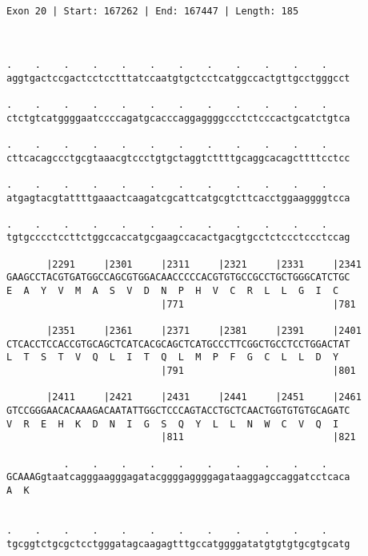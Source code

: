 \documentclass{article}
\begin{document}
\begin{Verbatim}
                                       
 
Exon 20 | Start: 167262 | End: 167447 | Length: 185



.    .    .    .    .    .    .    .    .    .    .    .    
aggtgactccgactcctcctttatccaatgtgctcctcatggccactgttgcctgggcct
                                                            
.    .    .    .    .    .    .    .    .    .    .    .    
ctctgtcatggggaatccccagatgcacccaggaggggccctctcccactgcatctgtca
                                                            
.    .    .    .    .    .    .    .    .    .    .    .    
cttcacagccctgcgtaaacgtccctgtgctaggtcttttgcaggcacagcttttcctcc
                                                            
.    .    .    .    .    .    .    .    .    .    .    .    
atgagtacgtattttgaaactcaagatcgcattcatgcgtcttcacctggaaggggtcca
                                                            
.    .    .    .    .    .    .    .    .    .    .    .    
tgtgcccctccttctggccaccatgcgaagccacactgacgtgcctctccctccctccag
                                                            
       |2291     |2301     |2311     |2321     |2331     |2341
GAAGCCTACGTGATGGCCAGCGTGGACAACCCCCACGTGTGCCGCCTGCTGGGCATCTGC
E  A  Y  V  M  A  S  V  D  N  P  H  V  C  R  L  L  G  I  C  
                           |771                          |781
  
       |2351     |2361     |2371     |2381     |2391     |2401
CTCACCTCCACCGTGCAGCTCATCACGCAGCTCATGCCCTTCGGCTGCCTCCTGGACTAT
L  T  S  T  V  Q  L  I  T  Q  L  M  P  F  G  C  L  L  D  Y  
                           |791                          |801
  
       |2411     |2421     |2431     |2441     |2451     |2461
GTCCGGGAACACAAAGACAATATTGGCTCCCAGTACCTGCTCAACTGGTGTGTGCAGATC
V  R  E  H  K  D  N  I  G  S  Q  Y  L  L  N  W  C  V  Q  I  
                           |811                          |821
  
          .    .    .    .    .    .    .    .    .    .    
GCAAAGgtaatcagggaagggagatacggggaggggagataaggagccaggatcctcaca
A  K                                                        
                                                            
  
.    .    .    .    .    .    .    .    .    .    .    .    
tgcggtctgcgctcctgggatagcaagagtttgccatggggatatgtgtgtgcgtgcatg
                                                            

\end{Verbatim}
\end{document}
